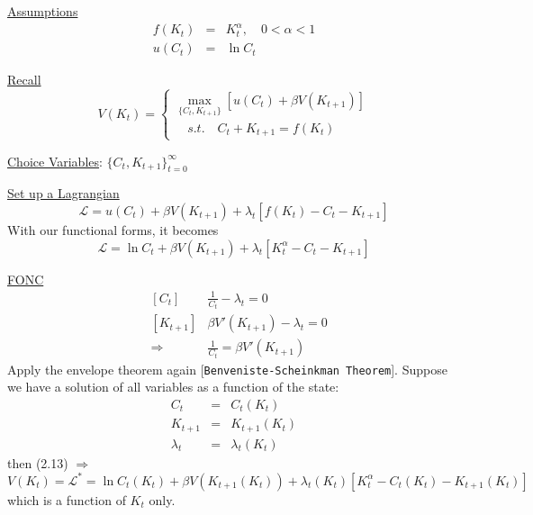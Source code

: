 \documentclass[twoside]{article}
\begin{document}
\underline{Assumptions}
\begin{eqnarray}
    f(K_t) &=& K_t^\alpha, \quad 0 < \alpha < 1\\
    u(C_t) &=& \ln C_t
\end{eqnarray}

\underline{Recall}
\begin{equation}
    V(K_t) = \begin{cases}
        \max\limits_{\{C_t, K_{t+1}\}} [u(C_t)+ \beta V(K_{t+1})]\\
        \quad s.t. \quad C_t + K_{t+1} = f(K_t)
    \end{cases}
\end{equation}

\underline{Choice Variables}: $\{C_t, K_{t+1}\}_{t=0}^{\infty}$

\underline{Set up a Lagrangian}
\begin{equation}
    \mathcal{L} = u(C_t)+ \beta V(K_{t+1}) + \lambda_t [ f(K_t) - C_t - K_{t+1}]
\end{equation}
With our functional forms, it becomes
\begin{equation}
    \mathcal{L} = \ln C_t+ \beta V(K_{t+1}) + \lambda_t [ K_t^\alpha - C_t - K_{t+1}]
\end{equation}

\underline{FONC}
\begin{eqnarray}
    &[C_t]&     \frac{1}{C_t} - \lambda_t = 0\\
    &[K_{t+1}]&  \beta V'(K_{t+1}) - \lambda_t = 0\\
    &\Longrightarrow& \frac{1}{C_t} = \beta V'(K_{t+1})
\end{eqnarray}
Apply the envelope theorem again [\texttt{Benveniste-Scheinkman Theorem}]. Suppose we have a solution of all variables as a function of the state:
\begin{eqnarray}
    C_t &=& C_t(K_t)\\
    K_{t+1} &=& K_{t+1}(K_t)\\
    \lambda_t &=& \lambda_t(K_t)
\end{eqnarray}
then (2.13) $\Longrightarrow$
\begin{equation}
    V(K_t) = \mathcal{L}^* = \ln C_t(K_t) + \beta V(K_{t+1}(K_t)) + \lambda_t(K_{t}) [ K_t^\alpha - C_t(K_t) - K_{t+1}(K_t)]
\end{equation}
which is a function of $K_t$ only.
\end{document}
